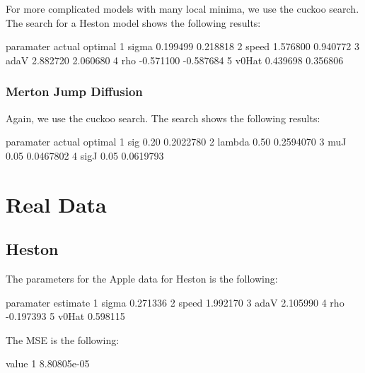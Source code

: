 \documentclass{article}
\begin{document}
For more complicated models with many local minima, we use the cuckoo search. The search for a Heston model shows the following results:

\begin{Schunk}
\begin{Soutput}
  paramater    actual   optimal
1     sigma  0.199499  0.218818
2     speed  1.576800  0.940772
3      adaV  2.882720  2.060680
4       rho -0.571100 -0.587684
5     v0Hat  0.439698  0.356806
\end{Soutput}
\end{Schunk}


\subsubsection{Merton Jump Diffusion}

Again, we use the cuckoo search. The search shows the following results:

\begin{Schunk}
\begin{Soutput}
  paramater actual   optimal
1       sig   0.20 0.2022780
2    lambda   0.50 0.2594070
3       muJ   0.05 0.0467802
4      sigJ   0.05 0.0619793
\end{Soutput}
\end{Schunk}


\section{Real Data}

\subsection{Heston}

The parameters for the Apple data for Heston is the following:

\begin{Schunk}
\begin{Soutput}
  paramater  estimate
1     sigma  0.271336
2     speed  1.992170
3      adaV  2.105990
4       rho -0.197393
5     v0Hat  0.598115
\end{Soutput}
\end{Schunk}

The MSE is the following:

\begin{Schunk}
\begin{Soutput}
        value
1 8.80805e-05
\end{Soutput}
\end{Schunk}
\end{document}
